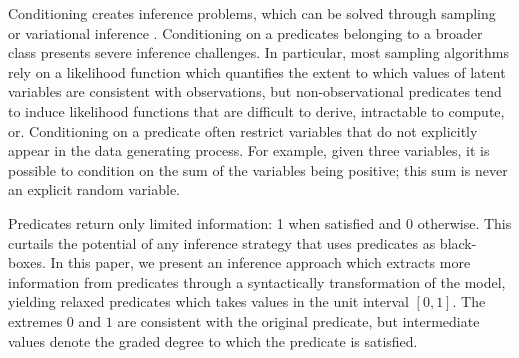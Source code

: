 


Conditioning creates inference problems, which can be solved through sampling \citep{andrieu2003introduction} or variational 
inference \citep{jordan1999introduction, ranganath2014black}.
Conditioning on a predicates belonging to a broader class presents severe inference challenges.
In particular, most sampling algorithms rely on a likelihood function which quantifies the extent to which values of latent variables are consistent with observations, but non-observational predicates tend to induce likelihood functions that are difficult to derive, intractable to compute, or.
Conditioning on a predicate often restrict variables that do not explicitly appear in the data generating process.
For example, given three variables, it is possible to condition on the sum
of the variables being positive; this sum is never an explicit random variable.



Predicates return only limited information: 1 when satisfied and 0 otherwise.
This curtails the potential of any inference strategy that uses predicates as black-boxes.
In this paper, we present an inference approach which extracts more information from predicates through a syntactically transformation of the model, yielding relaxed predicates which takes values in the unit interval $[0, 1]$. The extremes $0$ and $1$ are consistent with the original predicate, but intermediate values denote the graded degree to which the predicate is satisfied.

